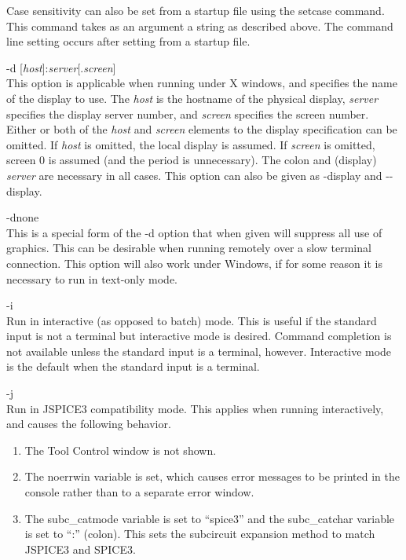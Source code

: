 \begin{description}
Case sensitivity can also be set from a startup file using the {\cb
setcase} command.  This command takes as an argument a string as
described above.  The command line setting occurs after setting from a
startup file.

\item{\vt -d} [{\it host}]:{\it server}[.{\it screen}]\\
This option is applicable when running under X windows, and specifies
the name of the display to use.  The {\it host} is the hostname of the
physical display, {\it server} specifies the display server number,
and {\it screen} specifies the screen number.  Either or both of the
{\it host} and {\it screen} elements to the display specification can
be omitted.  If {\it host} is omitted, the local display is assumed. 
If {\it screen} is omitted, screen 0 is assumed (and the period is
unnecessary).  The colon and (display) {\it server} are necessary in
all cases.  This option can also be given as {\vt -display} and {\vt
-\/-display}.

\item{\vt -dnone}\\
This is a special form of the {\vt -d} option that when given will
suppress all use of graphics.  This can be desirable when running
{\WRspice} remotely over a slow terminal connection.  This option will
also work under Windows, if for some reason it is necessary to run
{\WRspice} in text-only mode.

\item{\vt -i}\\
Run in interactive (as opposed to batch) mode.  This is useful if the
standard input is not a terminal but interactive mode is desired. 
Command completion is not available unless the standard input is a
terminal, however.  Interactive mode is the default when the standard
input is a terminal.

\item{\vt -j}\\
Run in JSPICE3 compatibility mode.  This applies when running
interactively, and causes the following behavior.
\begin{enumerate}
\item{The {\cb Tool Control} window is not shown.}
\item{The {\et noerrwin} variable is set, which causes error messages
to be printed in the console rather than to a separate error window.}
\item{The {\et subc\_catmode} variable is set to ``{\vt spice3}'' and
the {\et subc\_catchar} variable is set to ``{\vt :}'' (colon).  This
sets the subcircuit expansion method to match JSPICE3 and SPICE3.}
\end{enumerate}


\end{description}
